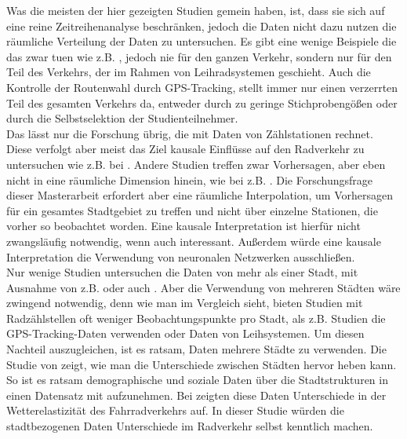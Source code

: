 \documentclass[a4paper,12pt]{thesis}
\begin{document}
Was die meisten der hier gezeigten Studien gemein haben, ist, dass sie sich auf eine reine Zeitreihenanalyse beschränken, jedoch die Daten nicht dazu nutzen die räumliche Verteilung der Daten zu untersuchen. Es gibt eine wenige Beispiele die das zwar tuen wie z.B. \cite{Alattar2021}, jedoch nie für den ganzen Verkehr, sondern nur für den Teil des Verkehrs, der im Rahmen von Leihradsystemen geschieht. Auch die Kontrolle der Routenwahl durch GPS-Tracking, stellt immer nur einen verzerrten Teil des gesamten Verkehrs da, entweder durch zu geringe Stichprobengößen oder durch die Selbstselektion der Studienteilnehmer.\\
Das lässt nur die Forschung übrig, die mit Daten von Zählstationen rechnet. Diese verfolgt aber meist das Ziel kausale Einflüsse auf den Radverkehr zu untersuchen wie z.B. bei \cite{Wessel2020}. Andere Studien treffen zwar Vorhersagen, aber eben nicht in eine räumliche Dimension hinein, wie bei z.B. \cite{Holmgren2017}. Die Forschungsfrage dieser Masterarbeit erfordert aber eine räumliche Interpolation, um Vorhersagen für ein gesamtes Stadtgebiet zu treffen und nicht über einzelne Stationen, die vorher so beobachtet worden. Eine kausale Interpretation ist hierfür nicht zwangsläufig notwendig, wenn auch interessant. Außerdem würde eine kausale Interpretation die Verwendung von neuronalen Netzwerken ausschließen.\\
Nur wenige Studien untersuchen die Daten von mehr als einer Stadt, mit Ausnahme von z.B. \cite{Wessel2020} oder auch \cite{Li2022}. Aber die Verwendung von mehreren Städten wäre zwingend notwendig, denn wie man im Vergleich sieht, bieten Studien mit Radzählstellen oft weniger Beobachtungspunkte pro Stadt, als z.B. Studien die GPS-Tracking-Daten verwenden oder Daten von Leihsystemen. Um diesen Nachteil auszugleichen, ist es ratsam, Daten mehrere Städte zu verwenden. Die Studie von \cite{Goldmann2021} zeigt, wie man die Unterschiede zwischen Städten hervor heben kann. So ist es ratsam demographische und soziale Daten über die Stadtstrukturen in einen Datensatz mit aufzunehmen. Bei \cite{Goldmann2021} zeigten diese Daten Unterschiede in der Wetterelastizität des Fahrradverkehrs auf. In dieser Studie würden die stadtbezogenen Daten Unterschiede im Radverkehr selbst kenntlich machen.\\
\end{document}
